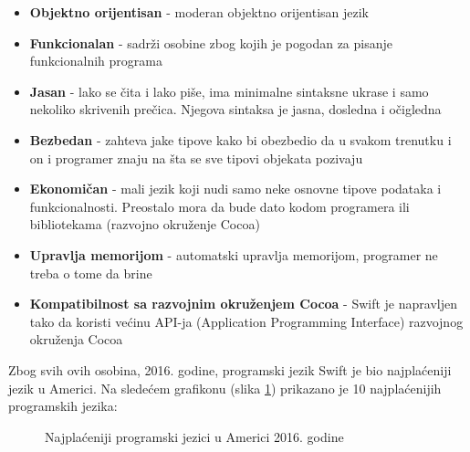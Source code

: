 \documentclass[a4paper]{article}
\begin{document}
\begin{itemize}
\item\textbf{Objektno orijentisan} - moderan objektno orijentisan jezik
\item\textbf{Funkcionalan} - sadrži osobine zbog kojih je pogodan za pisanje funkcionalnih programa
\item\textbf{Jasan} - lako se čita i lako piše, ima minimalne sintaksne ukrase i samo nekoliko skrivenih prečica. Njegova sintaksa je jasna, dosledna i očigledna
\item\textbf{Bezbedan} - zahteva jake tipove kako bi obezbedio da u svakom trenutku i on i programer znaju na šta se sve tipovi objekata pozivaju
\item\textbf{Ekonomičan} - mali jezik koji nudi samo neke osnovne tipove podataka i funkcionalnosti. Preostalo mora da bude dato kodom programera ili bibliotekama (razvojno okruženje Cocoa)
\item\textbf{Upravlja memorijom} - automatski upravlja memorijom, programer ne treba o tome da brine
\item\textbf{Kompatibilnost sa razvojnim okruženjem Cocoa} -  Swift je napravljen tako da koristi većinu API-ja (Application Programming Interface) razvojnog okruženja Cocoa
\end{itemize}

Zbog svih ovih osobina, 2016. godine, programski jezik Swift je bio najplaćeniji jezik u Americi. Na sledećem grafikonu (slika \ref{fig:grafikon}) prikazano je 10 najplaćenijih programskih jezika:

\begin{figure}[hbt!]
\hspace{2.5em}
\caption{Najplaćeniji programski jezici u Americi 2016. godine}
\label{fig:grafikon}
\end{figure}
\end{document}
